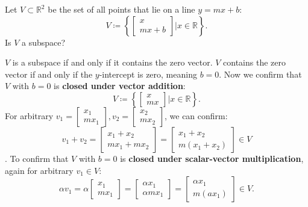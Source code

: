 \newpage

\begin{problem}
	Let \(V \subset \mathbb{R} ^2\) be the set of all points that lie on a line \(y=mx+b\):
	\[
		V \coloneqq \left\{ 
			\begin{bmatrix}
				x \\ mx + b
			\end{bmatrix}
			| x \in \mathbb{R} 
		 \right\}.
	\]
	Is \(V\) a subspace?
\end{problem}
\begin{answer}
	\(V\) is a subspace if and only if it contains the zero vector. \(V\) contains the zero vector if and only if the \(y\)-intercept is zero, meaning \(b=0\). Now we confirm that \(V\) with \(b=0\) is \textbf{closed under vector addition}:
	\[
		V \coloneqq \left\{ 
			\begin{bmatrix}
				x \\ mx
			\end{bmatrix}
			| x \in \mathbb{R} 
		 \right\}.
	\]
	For arbitrary \(v_1 = 
	\begin{bmatrix}
		x_1 \\ mx_1
	\end{bmatrix}, v_2 =
	\begin{bmatrix}
		x_2 \\ mx_2
	\end{bmatrix}\), we can confirm:
	\[
		v_1 + v_2 = \begin{bmatrix}
			x_1 + x_2 \\
			mx_1 + mx_2
		\end{bmatrix} = \begin{bmatrix}
			x_1 + x_2 \\
			m(x_1 + x_2)
		\end{bmatrix} \in V
	\]. 
	To confirm that \(V\) with \(b=0\) is \textbf{closed under scalar-vector multiplication}, again for arbitrary \(v_1 \in V\):
	\[
		\alpha v_1 = \alpha \begin{bmatrix}
			x_1 \\ mx_1
		\end{bmatrix} =
		\begin{bmatrix}
			\alpha x_1 \\
			\alpha m x_1
		\end{bmatrix} =
		\begin{bmatrix}
			\alpha x_1 \\
			m(ax_1)
		\end{bmatrix} \in V.
	\]
\end{answer}

